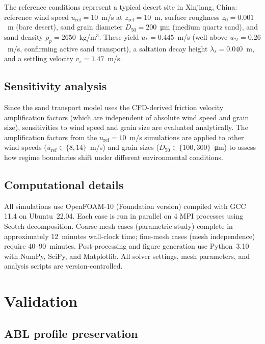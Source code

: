 \documentclass[preprint,12pt,review]{elsarticle}
\begin{document}
The reference conditions represent a typical desert site in Xinjiang, China: reference wind speed $u_\text{ref} = 10$~m/s at $z_\text{ref} = 10$~m, surface roughness $z_0 = 0.001$~m (bare desert), sand grain diameter $D_{50} = 200$~\si{\micro\metre} (medium quartz sand), and sand density $\rho_p = 2650$~kg/m$^3$.
These yield $u_* = 0.445$~m/s (well above $u_{*t} = 0.26$~m/s, confirming active sand transport), a saltation decay height $\lambda_s = 0.040$~m, and a settling velocity $v_s = 1.47$~m/s.

\subsection{Sensitivity analysis}

Since the sand transport model uses the CFD-derived friction velocity amplification factors (which are independent of absolute wind speed and grain size), sensitivities to wind speed and grain size are evaluated analytically. The amplification factors from the $u_\text{ref} = 10$~m/s simulations are applied to other wind speeds ($u_\text{ref} \in \{8, 14\}$~m/s) and grain sizes ($D_{50} \in \{100, 300\}$~\si{\micro\metre}) to assess how regime boundaries shift under different environmental conditions.

\subsection{Computational details}

All simulations use OpenFOAM-10 (Foundation version) compiled with GCC 11.4 on Ubuntu~22.04. Each case is run in parallel on 4 MPI processes using Scotch decomposition. Coarse-mesh cases (parametric study) complete in approximately 12~minutes wall-clock time; fine-mesh cases (mesh independence) require 40--90~minutes. Post-processing and figure generation use Python~3.10 with NumPy, SciPy, and Matplotlib. All solver settings, mesh parameters, and analysis scripts are version-controlled.

\section{Validation}
\label{sec:validation}

\subsection{ABL profile preservation}
\end{document}
